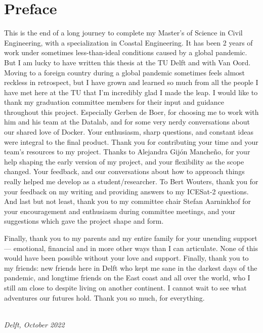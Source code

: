 \chapter*{Preface}
This is the end of a long journey to complete my Master's of Science in Civil Engineering, with a specialization in Coastal Engineering. It has been 2 years of work under sometimes less-than-ideal conditions caused by a global pandemic. But I am lucky to have written this thesis at the TU Delft and with Van Oord. Moving to a foreign country during a global pandemic sometimes feels almost reckless in retrospect, but I have grown and learned so much from all the people I have met here at the TU that I'm incredibly glad I made the leap.
\vskip 0.1in
I would like to thank my graduation committee members for their input and guidance throughout this project. Especially Gerben de Boer, for choosing me to work with him and his team at the Datalab, and for some very nerdy conversations about our shared love of Docker. Your enthusiasm, sharp questions, and constant ideas were integral to the final product. Thank you for contributing your time and your team's resources to my project. Thanks to Alejandra Gijón Mancheño, for your help shaping the early version of my project, and your flexibility as the scope changed. Your feedback, and our conversations about how to approach things really helped me develop as a student/researcher. To Bert Wouters, thank you for your feedback on my writing and providing answers to my ICESat-2 questions. And last but not least, thank you to my committee chair Stefan Aarninkhof for your encouragement and enthusiasm during committee meetings, and your suggestions which gave the project shape and form.
\vskip 0.1in

Finally, thank you to my parents and my entire family for your unending support --- emotional, financial and in more other ways than I can articulate. None of this would have been possible without your love and support. Finally, thank you to my friends: new friends here in Delft who kept me sane in the darkest days of the pandemic, and longtime friends on the East coast and all over the world, who I still am close to despite living on another continent. I cannot wait to see what adventures our futures hold. Thank you so much, for everything.
\vskip 0.3in
\begin{flushright}
{\makeatletter\itshape
    \@author \\
    Delft, October 2022
\makeatother}
\end{flushright}

